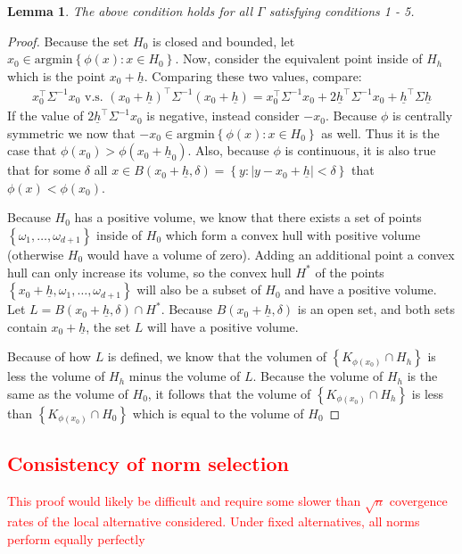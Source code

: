 \documentclass{article}
\newtheorem{lemma}[theorem]{Lemma}
\newcommand{\sh}{\textcolor{red}}
\newcounter{conditions}
\begin{document}
\begin{lemma}
	The above condition holds for all $\Gamma$ satisfying conditions 1 - 5. \label{lemma:aditional_anderson_cond}
\end{lemma}

\begin{proof}
	Because the set $H_0$ is closed and bounded, let $x_0 \in \text{argmin}\left\{\phi(x) : x \in H_0\right\}$. 
	Now, consider the equivalent point inside of $H_h$ which is the point $x_0 + \underline{h}$.  Comparing these two values, compare:
	\begin{align*}
		x_0^{\top}\Sigma^{-1}x_0 \text{ v.s. } (x_0 + \underline{h})^{\top}\Sigma^{-1}(x_0 + \underline{h}) = x_0^\top\Sigma^{-1}x_0 + 2 \underline{h}^{\top}\Sigma^{-1}x_0 + \underline{h}^{\top}\Sigma\underline{h}
	\end{align*}
	If the value of $2 \underline{h}^{\top}\Sigma^{-1}x_0$ is negative, instead consider $-x_0$.  Because $\phi$ is centrally symmetric we now that $-x_0 \in \text{argmin}\left\{\phi(x) : x \in H_0\right\}$ as well. 
	Thus it is the case that $\phi(x_0) > \phi(x_0 + \underline{h}_0)$.  Also, because $\phi$ is continuous, it is also true that for some $\delta$ all $x \in B(x_0 + \underline{h}, \delta) = \left\{y : |y - x_0 + \underline{h}| < \delta \right\}$ that $\phi(x) < \phi(x_0)$.  

	Because $H_0$ has a positive volume, we know that there exists a set of points $\left\{\omega_1, \dots, \omega_{d + 1}\right\}$ inside of $H_0$ which form a convex hull with positive volume (otherwise $H_0$ would have a volume of zero).  Adding an additional point a convex hull can only increase its volume, so the convex hull $H^*$ of the points $\left\{x_0 + \underline{h}, \omega_1, \dots, \omega_{d + 1}\right\}$ will also be a subset of $H_0$ and have a positive volume. Let $L = B(x_0 + \underline{h}, \delta) \cap H^*$.  Because $B(x_0 + \underline{h}, \delta)$ is an open set, and both sets contain $x_0 + \underline{h}$, the set $L$ will have a positive volume. 

	Because of how $L$ is defined, we know that the volumen of $\left\{K_{\phi(x_0)} \cap H_h \right\}$ is less the volume of $H_h$ minus the volume of $L$.  Because the volume of $H_h$ is the same as the volume of $H_0$, it follows that the volume of $\left\{K_{\phi(x_0)} \cap H_h \right\}$ is less than $\left\{K_{\phi(x_0)} \cap H_0 \right\}$ which is equal to the volume of $H_0$
\end{proof}

\sh{\subsection{Consistency of norm selection} 
This proof would likely be difficult and require some slower than $\sqrt{n}$ covergence rates of the local alternative considered.  Under fixed alternatives, all norms perform equally perfectly}
\end{document}
